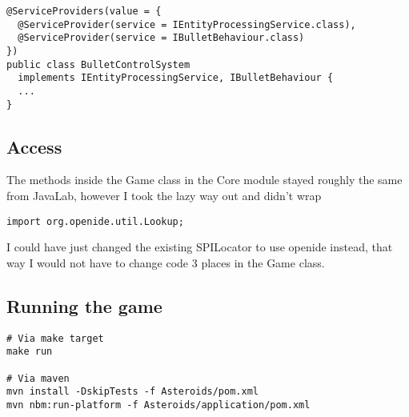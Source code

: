 \begin{verbatim}
@ServiceProviders(value = {
  @ServiceProvider(service = IEntityProcessingService.class),
  @ServiceProvider(service = IBulletBehaviour.class)
})
public class BulletControlSystem
  implements IEntityProcessingService, IBulletBehaviour {
  ...
}
\end{verbatim}

\subsection{Access}
The methods inside the Game class in the Core module stayed roughly the same
from JavaLab, however I took the lazy way out and didn't wrap 
\begin{verbatim}
import org.openide.util.Lookup;
\end{verbatim}
I could have just changed the existing SPILocator to use openide instead, that way
I would not have to change code 3 places in the Game class.


\subsection{Running the game}
\begin{verbatim}
# Via make target
make run

# Via maven
mvn install -DskipTests -f Asteroids/pom.xml
mvn nbm:run-platform -f Asteroids/application/pom.xml
\end{verbatim}
